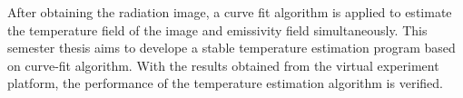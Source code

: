 After obtaining the radiation image, a curve fit algorithm is applied to estimate 
the temperature field of the image and emissivity field simultaneously. This semester 
thesis aims to develope a stable temperature estimation program based on curve-fit 
algorithm. With the results obtained from the virtual experiment platform, the 
performance of the temperature estimation algorithm is verified.

